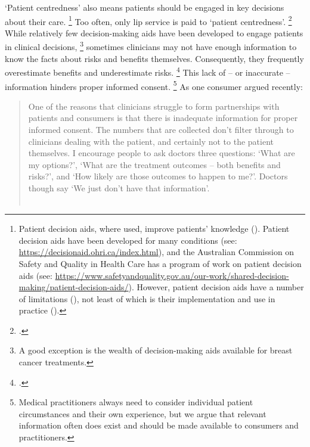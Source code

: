 \documentclass[FrontPage]{grattan}
\begin{document}
`Patient centredness' also means patients should be engaged in key decisions about their care.%
	\footnote{Patient decision aids, where used, improve patients' knowledge (\textcites{Stacey_2017}{Brown_2015}).
	Patient decision aids have been developed for many conditions (see: \textcolor{blue}{\url{https://decisionaid.ohri.ca/index.html}}), and the Australian Commission on Safety and Quality in Health Care has a program of work on patient decision aids (see: \textcolor{blue}{\url{https://www.safetyandquality.gov.au/our-work/shared-decision-making/patient-decision-aids/}}).
	However, patient decision aids have a number of limitations (\textcite{Agoritsas_2015}), not least of which is their implementation and use in practice (\textcite{Elwyn_2008}).}
Too often, only lip service is paid to `patient centredness'.%
	\footcites{lgar2014twelve}{stiggelbout2015shared}
While relatively few decision-making aids have been developed to engage patients in clinical decisions,%
	\footnote{A good exception is the wealth of decision-making aids available for breast cancer treatments.} sometimes clinicians may not have enough information to know the facts about risks and benefits themselves.
Consequently, they frequently overestimate benefits and underestimate risks.%
	\footcite{hoffmann2017clinicians}
This lack of -- or inaccurate -- information hinders proper informed consent.%
	\footnote{Medical practitioners always need to consider individual patient circumstances and their own experience, but we argue that relevant information often does exist and should be made available to consumers and practitioners.}
As one consumer argued recently:

\providecommand{\dictaline}{\textemdash}
\begin{quote}
One of the reasons that clinicians struggle to form partnerships with patients and consumers is that there is inadequate information for proper informed consent.
The numbers that are collected don't filter through to clinicians dealing with the patient, and certainly not to the patient themselves.
I encourage people to ask doctors three questions: `What are my options?', `What are the treatment outcomes -- both benefits and risks?', and `How likely are those outcomes to happen to me?'.
Doctors though say `We just don't have that information'.\\[-0.5\baselineskip]\null	\hfill\dictaline\ \textcite{Carey-2017-SPHERE}\par
\end{quote}
\end{document}
